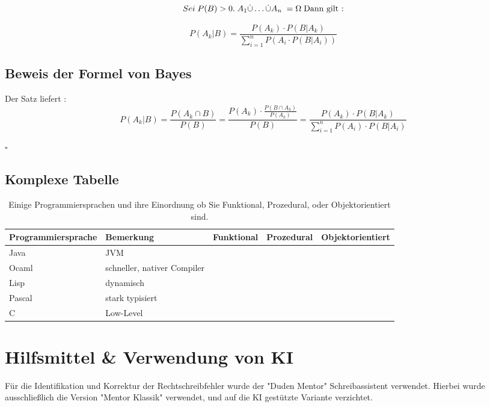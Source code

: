 \documentclass[paper=a4,fontsize=12pt,ngerman]{scrartcl}
\newcommand{\cmark}{\ding{51}}
\newcommand{\xmark}{\ding{55}}
\begin{document}
\[
Sei \; P(B)>0. \; A_1 \dot{\cup} \ldots \dot{\cup} A_n \;  =\Omega \; \text{Dann gilt :} \newline
\]

\[
P(A_k | B) = \frac{P(A_k)  \cdot P(B | A_k)}{\sum_{i=1}^{n}P(A_i  \cdot P(B | A_i))}
\]

\subsection{Beweis der Formel von Bayes}

Der Satz liefert : 
\[ 
P(A_k | B) = \frac{P(A_k \cap B)}{P(B)} = \frac{P(A_k) \cdot \frac{P(B \cap A_k)}{P(A_k)}} {P(B)} = \frac{P(A_k) \cdot P(B | A_k)}{ \sum_{i=1}^{n}P(A_i) \cdot P(B | A_i)}
\]

$\square$

\subsection{Komplexe Tabelle}

\begin{table}[ht]
    \centering

    \begin{adjustbox}{max width=0.8\textwidth}


        \begin{tabular}{@{} l l c c c @{}}
        \toprule

        \textbf{Programmiersprache} & \textbf{Bemerkung} & \textbf{Funktional} & \textbf{Prozedural} & \textbf{Objektorientiert} \\
        \midrule
            
            Java & JVM & \xmark & \xmark & \cmark   \\
            Ocaml & schneller, nativer Compiler & \cmark & \xmark & \xmark \\
            Lisp & dynamisch & \cmark & \xmark & \xmark \\
            Pascal & stark typisiert & \xmark & \cmark & \xmark \\ 
            C & Low-Level & \xmark & \cmark & \xmark \\

        \bottomrule

            
        \end{tabular}
    
    \end{adjustbox}

    \caption{Einige Programmiersprachen und ihre Einordnung ob Sie Funktional, Prozedural,
     oder Objektorientiert sind.}
    \label{tab:compar}
    
\end{table}


\section{Hilfsmittel \& Verwendung von KI}
Für die Identifikation und Korrektur der Rechtschreibfehler wurde der "Duden Mentor" Schreibassistent 
verwendet. Hierbei wurde ausschließlich die Version "Mentor Klassik" verwendet, und auf die KI gestützte Variante
verzichtet. 
\end{document}
